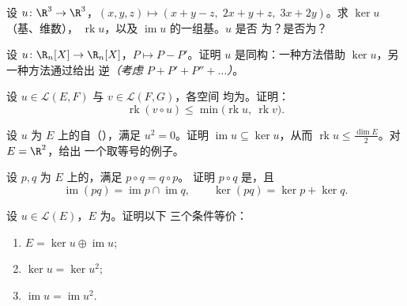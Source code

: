 \begin{exercise}[$\star$]\label{exo:b1:linmaps:2}
设 $u \colon \R^3 \to \R^3$，$(x,y,z) \mapsto (x + y - z,\; 2x + y
+ z,\; 3x + 2y)$。求 $\ker u$（基、维数），
$\operatorname{rk} u$，以及 $\operatorname{im} u$ 的一组基。$u$ 是否
为？是否为？
\end{exercise}

\begin{exercise}[$\star$]\label{exo:b1:linmaps:3}
设 $u \colon \R_n[X] \to \R_n[X]$，$P \mapsto P - P'$。证明
$u$ 是同构：一种方法借助 $\ker u$，另一种方法通过给出
逆\emph{（考虑 $P + P' + P'' + \dots$）}。
\end{exercise}

\begin{exercise}[$\star$]\label{exo:b1:linmaps:4}
设 $u \in \mathcal{L}(E, F)$ 与 $v \in \mathcal{L}(F, G)$，各空间
均为。证明：
\[
\operatorname{rk}(v \circ u) \leq
\min\bigl(\operatorname{rk} u,\ \operatorname{rk} v\bigr).
\]
\end{exercise}

\begin{exercise}[$\star\star$]\label{exo:b1:linmaps:5}
设 $u$ 为 $E$ 上的自（），满足 $u^2 =
0$。证明 $\operatorname{im} u \subseteq \ker u$，从而
$\operatorname{rk} u \leq \frac{\dim E}{2}$。对 $E = \R^2$，给出
一个取等号的例子。
\end{exercise}

\begin{exercise}[$\star\star$]\label{exo:b1:linmaps:6}
设 $p, q$ 为 $E$ 上的，满足 $p \circ q = q \circ p$。
证明 $p \circ q$ 是，且
\[
\operatorname{im}(pq) = \operatorname{im} p \cap \operatorname{im}
q ,
\qquad
\ker (pq) = \ker p + \ker q .
\]
\end{exercise}

\begin{exercise}[$\star\star$]\label{exo:b1:linmaps:7}
设 $u \in \mathcal{L}(E)$，$E$ 为。证明以下
三个条件等价：
\begin{enumerate}
  \item $E = \ker u \oplus \operatorname{im} u$;
  \item $\ker u = \ker u^2$;
  \item $\operatorname{im} u = \operatorname{im} u^2$.
\end{enumerate}
\end{exercise}

